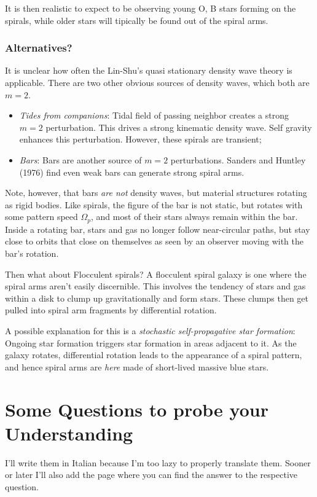 It is then realistic to expect to be observing young O, B stars forming on the spirals, while older stars will tipically be found out of the spiral arms.

\subsubsection*{Alternatives?}
It is unclear how often the Lin-Shu’s quasi stationary density wave theory is applicable. There are two other obvious sources of density waves, which both are $m = 2$.
\begin{itemize}
    \item \emph{Tides from companions}: Tidal field of passing neighbor creates a strong $m = 2$ perturbation. This drives a strong kinematic density wave. Self gravity enhances this perturbation. However, these spirals are transient;
    \item \emph{Bars}: Bars are another source of $m = 2$ perturbations. Sanders and Huntley (1976) find even weak bars can generate strong spiral arms.
\end{itemize}
Note, however, that bars \emph{are not} density waves, but material structures rotating as rigid bodies. Like spirals, the figure of the bar is not static, but rotates with some pattern speed $\Omega_{p}$, and most of their stars always remain within the bar. Inside a rotating bar, stars and gas no longer follow near-circular paths, but stay close to orbits that close on themselves as seen by an observer moving with the bar’s rotation.
\par Then what about Flocculent spirals? A flocculent spiral galaxy is one where the spiral arms aren't easily discernible. This involves the tendency of stars and gas within a disk to clump up gravitationally and form stars. These clumps then get pulled into spiral arm fragments by differential rotation.
\par A possible explanation for this is a \emph{stochastic self-propagative star formation}: Ongoing star formation triggers star formation in areas adjacent to it. As the galaxy rotates, differential rotation leads to the appearance of a spiral pattern, and hence spiral arms are \emph{here} made of short-lived massive blue stars.

\newpage
\section*{Some Questions to probe your Understanding}

I'll write them in Italian because I'm too lazy to properly translate them. Sooner or later I'll also add the page where you can find the answer to the respective question.

